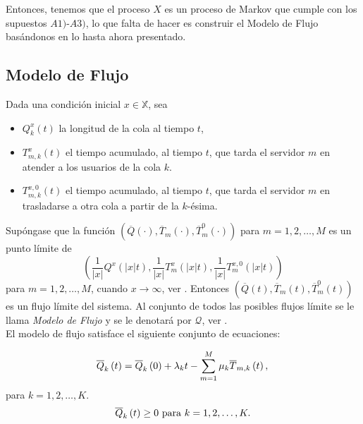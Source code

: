 Entonces, tenemos que el proceso $X$ es un proceso de Markov que
cumple con los supuestos $A1)$-$A3)$, lo que falta de hacer es
construir el Modelo de Flujo bas\'andonos en lo hasta ahora
presentado.
\subsection{Modelo de Flujo}

Dada una condici\'on inicial $x\in\mathbb{X}$, sea

\begin{itemize}
\item $Q_{k}^{x}\left(t\right)$ la longitud de la cola al tiempo
$t$,

\item $T_{m,k}^{x}\left(t\right)$ el tiempo acumulado, al tiempo
$t$, que tarda el servidor $m$ en atender a los usuarios de la
cola $k$.

\item $T_{m,k}^{x,0}\left(t\right)$ el tiempo acumulado, al tiempo
$t$, que tarda el servidor $m$ en trasladarse a otra cola a partir de la $k$-\'esima.\\
\end{itemize}

Sup\'ongase que la funci\'on
$\left(\overline{Q}\left(\cdot\right),\overline{T}_{m}
\left(\cdot\right),\overline{T}_{m}^{0} \left(\cdot\right)\right)$
para $m=1,2,\ldots,M$ es un punto l\'imite de
\begin{equation}\label{Eq.Punto.Limite}
\left(\frac{1}{|x|}Q^{x}\left(|x|t\right),\frac{1}{|x|}T_{m}^{x}\left(|x|t\right),\frac{1}{|x|}T_{m}^{x,0}\left(|x|t\right)\right)
\end{equation}
para $m=1,2,\ldots,M$, cuando $x\rightarrow\infty$, ver
\cite{Down}. Entonces
$\left(\overline{Q}\left(t\right),\overline{T}_{m}
\left(t\right),\overline{T}_{m}^{0} \left(t\right)\right)$ es un
flujo l\'imite del sistema. Al conjunto de todos las posibles
flujos l\'imite se le llama {\emph{Modelo de Flujo}} y se le
denotar\'a por $\mathcal{Q}$, ver \cite{Down, Dai, DaiSean}.\\

El modelo de flujo satisface el siguiente conjunto de ecuaciones:

\begin{equation}\label{Eq.MF.1}
\overline{Q}_{k}\left(t\right)=\overline{Q}_{k}\left(0\right)+\lambda_{k}t-\sum_{m=1}^{M}\mu_{k}\overline{T}_{m,k}\left(t\right),\\
\end{equation}
para $k=1,2,\ldots,K$.\\
\begin{equation}\label{Eq.MF.2}
\overline{Q}_{k}\left(t\right)\geq0\textrm{ para
}k=1,2,\ldots,K.\\
\end{equation}

